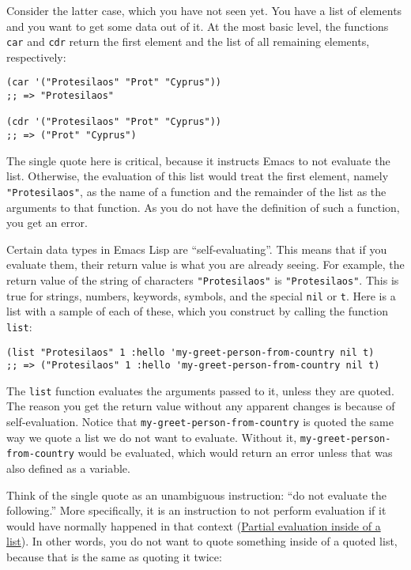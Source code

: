 \documentclass[11pt]{ctexart}
\begin{document}
Consider the latter case, which you have not seen yet. You have a list of elements and you want to get some data out of it. At the most basic level, the functions \texttt{car} and \texttt{cdr} return the first element and the list of all remaining elements, respectively:

\begin{verbatim}
(car '("Protesilaos" "Prot" "Cyprus"))
;; => "Protesilaos"

(cdr '("Protesilaos" "Prot" "Cyprus"))
;; => ("Prot" "Cyprus")
\end{verbatim}

The single quote here is critical, because it instructs Emacs to not evaluate the list. Otherwise, the evaluation of this list would treat the first element, namely \texttt{"Protesilaos"}, as the name of a function and the remainder of the list as the arguments to that function. As you do not have the definition of such a function, you get an error.

Certain data types in Emacs Lisp are ``self-evaluating''. This means that if you evaluate them, their return value is what you are already seeing. For example, the return value of the string of characters \texttt{"Protesilaos"} is \texttt{"Protesilaos"}. This is true for strings, numbers, keywords, symbols, and the special \texttt{nil} or \texttt{t}. Here is a list with a sample of each of these, which you construct by calling the function \texttt{list}:

\begin{verbatim}
(list "Protesilaos" 1 :hello 'my-greet-person-from-country nil t)
;; => ("Protesilaos" 1 :hello 'my-greet-person-from-country nil t)
\end{verbatim}

The \texttt{list} function evaluates the arguments passed to it, unless they are quoted. The reason you get the return value without any apparent changes is because of self-evaluation. Notice that \texttt{my-greet-person-from-country} is quoted the same way we quote a list we do not want to evaluate. Without it, \texttt{my-greet-person-from-country} would be evaluated, which would return an error unless that was also defined as a variable.

Think of the single quote as an unambiguous instruction: ``do not evaluate the following.'' More specifically, it is an instruction to not perform evaluation if it would have normally happened in that context (\hyperref[sec:org771b57a]{Partial evaluation inside of a list}). In other words, you do not want to quote something inside of a quoted list, because that is the same as quoting it twice:
\end{document}
